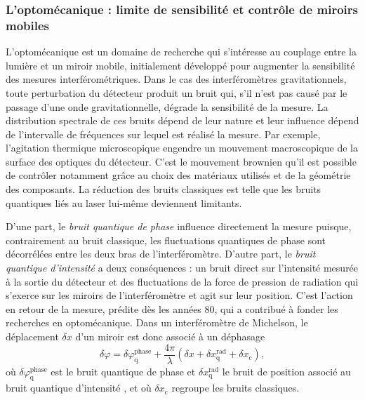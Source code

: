 \documentclass[12pt,a4paper]{article}
\begin{document}
\subsubsection{L'optomécanique : limite de sensibilité et contrôle de miroirs mobiles}

L'optomécanique est un domaine de recherche qui s'intéresse au couplage entre la lumière et un miroir mobile, initialement développé pour augmenter la sensibilité des mesures interférométriques. 
Dans le cas des interféromètres gravitationnels, toute perturbation du détecteur produit un bruit qui, s'il n'est pas causé par le passage d'une onde gravitationnelle, dégrade la sensibilité de la mesure.
La distribution spectrale de ces bruits dépend de leur nature et leur influence dépend de l'intervalle de fréquences sur lequel est réalisé la mesure.
Par exemple, l'agitation thermique microscopique engendre un mouvement macroscopique de la surface des optiques du détecteur.
C'est le mouvement brownien qu'il est possible de contrôler notamment grâce au choix des matériaux utilisés et de la géométrie des composants.
La réduction des bruits classiques est telle que les bruits quantiques liés au laser lui-même deviennent limitants.

D'une part, le \textit{bruit quantique de phase} influence directement la mesure puisque, contrairement au bruit classique, les fluctuations quantiques de phase sont décorrélées entre les deux bras de l'interféromètre.
D'autre part, le \textit{bruit quantique d'intensité} a deux conséquences : un bruit direct sur l'intensité mesurée à la sortie du détecteur et des fluctuations de la force de pression de radiation qui s'exerce sur les miroirs de l'interféromètre et agit sur leur position.
C'est l'action en retour de la mesure, prédite dès les années 80, qui a contribué à fonder les recherches en optomécanique.
Dans un interféromètre de Michelson, le déplacement $\delta x$ d'un miroir est donc associé à un déphasage
\begin{equation}
\delta \varphi = \delta \varphi ^\mathrm{phase} _\mathrm{q} + \frac{4\pi}{\lambda} ( \delta x + \delta x ^\mathrm{rad} _\mathrm{q} + \delta x_\mathrm{c}),
\label{eq:disp}
\end{equation}
où $\delta \varphi ^\mathrm{phase} _\mathrm{q}$ est le bruit quantique de phase et $\delta x ^\mathrm{rad} _\mathrm{q}$ le bruit de position associé au bruit quantique d'intensité , et où $\delta x_\mathrm{c}$ regroupe les bruits classiques.
\end{document}
